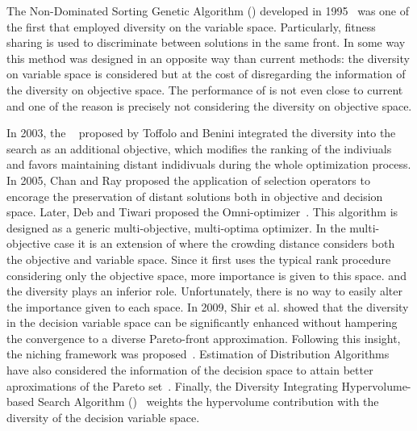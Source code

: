The Non-Dominated Sorting Genetic Algorithm (\NSGA{}) developed in 1995~\cite{srinivas1994muiltiobjective} 
was one of the first \MOEAS{} that employed diversity on the variable space.
%
Particularly, fitness sharing is used to discriminate between solutions in the same front.
%
%
In some way this method was designed in an opposite way than current methods: the diversity
on variable space is considered but at the cost of disregarding the information of the diversity
on objective space.
%
The performance of \NSGA{} is not even close to current \MOEAS{} and one 
of the reason is precisely not considering the diversity on objective space.

In 2003, the \GDEA{}~\cite{toffolo2003genetic} proposed by Toffolo and Benini integrated the diversity into the search 
as an additional objective, which modifies the ranking of the indiviuals and favors maintaining distant indidivuals
during the whole optimization process.
%
In 2005, Chan and Ray \cite{chan2005evolutionary} proposed the application of selection operators to
encorage the preservation of distant solutions both in objective and decision space.
%
%
Later, Deb and Tiwari proposed the Omni-optimizer~\cite{deb2008omni}.
%
This algorithm is designed as a generic multi-objective, multi-optima optimizer. %
%
In the multi-objective case it is an extension of \NSGAII{} where the crowding distance considers both the objective and variable space.
%
Since it first uses the typical rank procedure considering only the objective space, more importance is given to this space. 
and the diversity plays an inferior role.
%
Unfortunately, there is no way to easily alter the importance given to each space.
%
In 2009, Shir et al. showed that the diversity in the decision variable space can be significantly enhanced without hampering 
the convergence to a diverse Pareto-front approximation.
%
Following this insight, the \CMAES{} niching framework was proposed~\cite{shir2009enhancing}.
%
Estimation of Distribution Algorithms have also considered the information of the decision space
to attain better aproximations of the Pareto set~\cite{zhou2009approximating}.
%
Finally, the Diversity Integrating Hypervolume-based Search Algorithm (\DIVA{})~\cite{ulrich2010integrating}
weights the hypervolume contribution with the diversity of the decision variable space.

